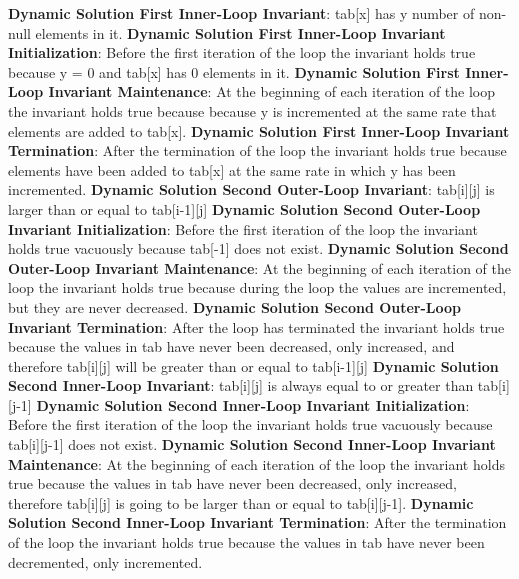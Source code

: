 \documentclass[onecolumn, 12pt, article]{IEEEtran}
\numberwithin{case}{problem}
\numberwithin{condition}{problem}
\numberwithin{condition}{subsection}
\numberwithin{definition}{section}
\theoremstyle{remark}
\numberwithin{question}{problem}
\theoremstyle{plain}
\numberwithin{answer}{problem}
\numberwithin{solution}{section}
\numberwithin{equation}{section}%
\begin{document}
\textbf{Dynamic Solution First Inner-Loop Invariant}: tab[x] has y number of non-null elements in it.
\newline
\textbf{Dynamic Solution First Inner-Loop Invariant Initialization}: Before the first iteration of the loop the invariant holds true because y = 0 and tab[x] has 0 elements in it.
\newline
\textbf{Dynamic Solution First Inner-Loop Invariant Maintenance}: At the beginning of each iteration of the loop the invariant holds true because because y is incremented at the same rate that elements are added to tab[x].
\newline
\textbf{Dynamic Solution First Inner-Loop Invariant Termination}: After the termination of the loop the invariant holds true because elements have been added to tab[x] at the same rate in which y has been incremented.
\newline
\newline
\textbf{Dynamic Solution Second Outer-Loop Invariant}: tab[i][j] is larger than or equal to tab[i-1][j]
\newline
\textbf{Dynamic Solution Second Outer-Loop Invariant Initialization}: Before the first iteration of the loop the invariant holds true vacuously because tab[-1] does not exist.
\newline
\textbf{Dynamic Solution Second Outer-Loop Invariant Maintenance}: At the beginning of each iteration of the loop the invariant holds true because during the loop the values are incremented, but they are never decreased.
\newline
\textbf{Dynamic Solution Second Outer-Loop Invariant Termination}: After the loop has terminated the invariant holds true because the values in tab have never been decreased, only increased, and therefore tab[i][j] will be greater than or equal to tab[i-1][j]
\newline
\newline
\textbf{Dynamic Solution Second Inner-Loop Invariant}: tab[i][j] is always equal to or greater than tab[i][j-1]
\newline
\textbf{Dynamic Solution Second Inner-Loop Invariant Initialization}: Before the first iteration of the loop the invariant holds true vacuously because tab[i][j-1] does not exist.
\newline
\textbf{Dynamic Solution Second Inner-Loop Invariant Maintenance}: At the beginning of each iteration of the loop the invariant holds true because the values in tab have never been decreased, only increased, therefore tab[i][j] is going to be larger than or equal to tab[i][j-1].
\newline
\textbf{Dynamic Solution Second Inner-Loop Invariant Termination}: After the termination of the loop the invariant holds true because the values in tab have never been decremented, only incremented.
\newline
\newline
\end{document}
